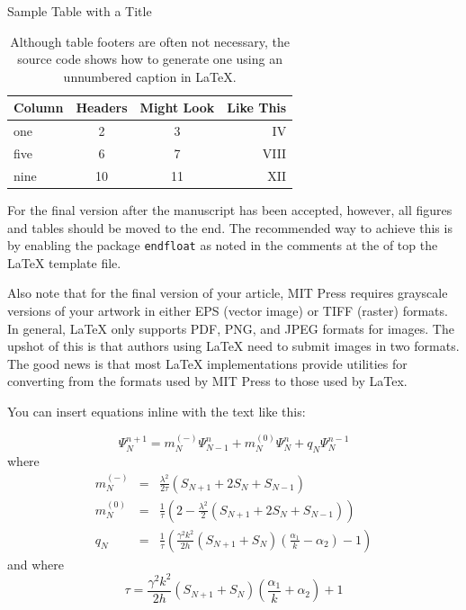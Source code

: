 \documentclass[letterpaper, 12pt]{article}
\begin{document}
\begin{table}[]
\caption{Sample Table with a Title}
\centering
\begin{tabular}{lccr}
  \hline
  \textbf{Column} & \textbf{Headers} & \textbf{Might Look} & \textbf{Like This}  \\
  \hline
  one & 2 & 3 & IV \\
  five & 6 & 7 & VIII \\
  nine & 10 & 11 & XII \\
   \hline
\end{tabular}
\caption*{\textnormal{{\small Although table footers are often not necessary, the source code shows how to generate one using an unnumbered caption in LaTeX.}}}
\label{tab:myTable}
\end{table}%


For the final version after the manuscript has been accepted, however, all figures and tables should be moved to the end.
The recommended way to achieve this is by enabling the package {\tt endfloat} as noted in the comments at the of top the LaTeX template file.

Also note that for the final version of your article, MIT Press requires grayscale versions of your artwork in either EPS (vector image) or TIFF (raster) formats.
In general, LaTeX only supports PDF, PNG, and JPEG formats for images.
The upshot of this is that authors using LaTeX need to submit images in two formats.
The good news is that most LaTeX implementations provide utilities for converting from the formats used by MIT Press to those used by LaTex.

You can insert equations inline with the text like this:

\begin{equation}
	\label{radupdate}
		\Psi_{N}^{n+1} = m_{N}^{(-)}\Psi_{N-1}^{n}+m_{N}^{(0)}\Psi_{N}^{n} + q_{N}\Psi_{N}^{n-1}
\end{equation}
where
\begin{eqnarray*}
	m_{N}^{(-)} &=& \frac{\lambda^2}{2\tau}\left(S_{N+1}+2S_{N}+S_{N-1}\right)\\
	m_{N}^{(0)} &=& \frac{1}{\tau}\left(2-\frac{\lambda^2}{2}\left(S_{N+1}+2S_{N}+S_{N-1}\right)\right)\\
	q_{N} &=& \frac{1}{\tau}\left(\frac{\gamma^2 k^2}{2h}\left(S_{N+1}+S_{N}\right)\left(\frac{\alpha_{1}}{k}-	\alpha_{2}\right)-1\right)
\end{eqnarray*}
and where 
\begin{equation*}
	\tau = \frac{\gamma^2 k^2}{2h}\left(S_{N+1}+S_{N}\right)\left(\frac{\alpha_{1}}{k}+\alpha_{2}\right)+1
\end{equation*}
\end{document}
